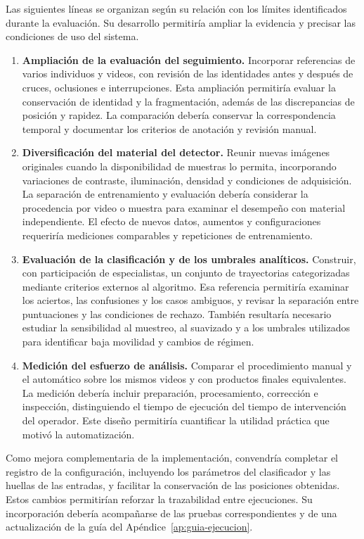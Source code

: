 Las siguientes líneas se organizan según su relación con los límites identificados durante la evaluación. Su desarrollo permitiría ampliar la evidencia y precisar las condiciones de uso del sistema.

\begin{enumerate}
  \item \textbf{Ampliación de la evaluación del seguimiento.} Incorporar referencias de varios individuos y videos, con revisión de las identidades antes y después de cruces, oclusiones e interrupciones. Esta ampliación permitiría evaluar la conservación de identidad y la fragmentación, además de las discrepancias de posición y rapidez. La comparación debería conservar la correspondencia temporal y documentar los criterios de anotación y revisión manual.

  \item \textbf{Diversificación del material del detector.} Reunir nuevas imágenes originales cuando la disponibilidad de muestras lo permita, incorporando variaciones de contraste, iluminación, densidad y condiciones de adquisición. La separación de entrenamiento y evaluación debería considerar la procedencia por video o muestra para examinar el desempeño con material independiente. El efecto de nuevos datos, aumentos y configuraciones requeriría mediciones comparables y repeticiones de entrenamiento.

  \item \textbf{Evaluación de la clasificación y de los umbrales analíticos.} Construir, con participación de especialistas, un conjunto de trayectorias categorizadas mediante criterios externos al algoritmo. Esa referencia permitiría examinar los aciertos, las confusiones y los casos ambiguos, y revisar la separación entre puntuaciones y las condiciones de rechazo. También resultaría necesario estudiar la sensibilidad al muestreo, al suavizado y a los umbrales utilizados para identificar baja movilidad y cambios de régimen.

  \item \textbf{Medición del esfuerzo de análisis.} Comparar el procedimiento manual y el automático sobre los mismos videos y con productos finales equivalentes. La medición debería incluir preparación, procesamiento, corrección e inspección, distinguiendo el tiempo de ejecución del tiempo de intervención del operador. Este diseño permitiría cuantificar la utilidad práctica que motivó la automatización.
\end{enumerate}

Como mejora complementaria de la implementación, convendría completar el registro de la configuración, incluyendo los parámetros del clasificador y las huellas de las entradas, y facilitar la conservación de las posiciones obtenidas. Estos cambios permitirían reforzar la trazabilidad entre ejecuciones. Su incorporación debería acompañarse de las pruebas correspondientes y de una actualización de la guía del Apéndice~\ref{ap:guia-ejecucion}.
